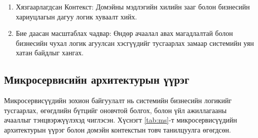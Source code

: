 \begin{enumerate}
\item Хязгаарлагдсан Контекст: Домэйны мэдлэгийн хилийн зааг болон бизнесийн хариуцлагын дагуу логик хуваалт хийх.
\item Бие даасан масштаблах чадвар: Өндөр ачаалал авах магадлалтай болон бизнесийн чухал логик агуулсан хэсгүүдийг тусгаарлах замаар системийн уян хатан байдлыг хангах.
\end{enumerate}

\subsection{Микросервисийн архитектурын үүрэг}
Микросервисүүдийн зохион байгуулалт нь системийн бизнесийн логикийг тусгаарлах, өгөгдлийн бүтцийг оновчтой болгох, болон үйл ажиллагааны ачааллыг тэнцвэржүүлэхэд чиглэсэн. Хүснэгт \ref{tab:ms}-т микросервисүүдийн архитектурын үүрэг болон домэйн контекстын товч танилцуулга өгөгдсөн.



